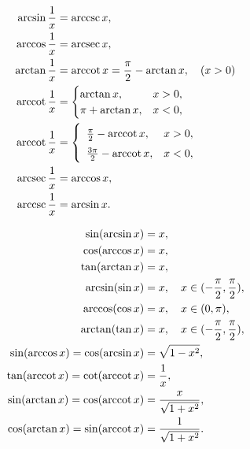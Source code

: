 \begin{theorem}[倒数关系]
\begin{align}
\arcsin\frac{1}{x} &= \arccsc x, \\
\arccos\frac{1}{x} &= \arcsec x, \\
\arctan\frac{1}{x} &= \arccot x
	= \frac{\pi}{2} - \arctan x, \quad(x>0) \\
\arccot\frac{1}{x} &= \begin{cases}
	\arctan x, & x>0, \\
	\pi+\arctan x, & x<0,
	\end{cases} \\
\arccot\frac{1}{x} &= \left\{ \def\arraystretch{1.5} \begin{array}{lc}
	\frac{\pi}{2} - \arccot x, & x>0, \\
	\frac{3\pi}{2} - \arccot x, & x<0,
	\end{array} \right. \\
\arcsec\frac{1}{x} &= \arccos x, \\
\arccsc\frac{1}{x} &= \arcsin x.
\end{align}
\end{theorem}

\begin{theorem}[三角关系]
\begin{align}
\sin(\arcsin{x}) &= x, \\
\cos(\arccos{x}) &= x, \\
\tan(\arctan{x}) &= x, \\
\arcsin(\sin x) &= x, \quad x \in (-\frac{\pi}{2},\frac{\pi}{2}), \\
\arccos(\cos x) &= x, \quad x \in (0,\pi), \\
\arctan(\tan x) &= x, \quad x \in (-\frac{\pi}{2},\frac{\pi}{2}), \\
\sin(\arccos{x}) = \cos(\arcsin{x}) &= \sqrt{1 - x^2}, \\
\tan(\arccot{x}) = \cot(\arccot{x}) &= \frac{1}{x}, \\
\sin(\arctan{x}) = \cos(\arccot{x}) &= \frac{x}{\sqrt{1+x^2}}, \\
\cos(\arctan{x}) = \sin(\arccot{x}) &= \frac{1}{\sqrt{1+x^2}}.
\end{align}
\end{theorem}

